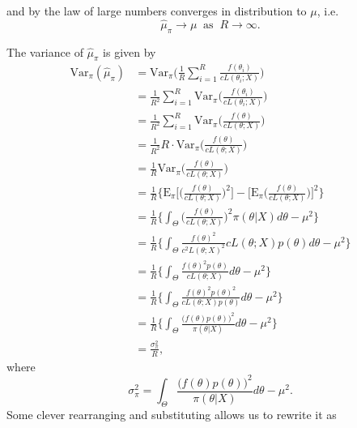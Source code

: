 \documentclass[
  12pt]{article}
\begin{document}
and by the law of large numbers converges in distribution to \(\mu\),
i.e. \[
\hat{\mu}_{\pi} \to \mu \> \text{ as } \> R \to \infty.
\]

The variance of \(\hat{\mu}_{\pi}\) is given by \[
\begin{aligned}
\text{Var}_{\pi}(\hat{\mu}_{\pi}) &= \text{Var}_{\pi}\Bigg(\frac{1}{R} \sum_{i=1}^R \frac{f(\theta_i)}{c L(\theta_i;X)}\Bigg) \\
                                  &= \frac{1}{R^2} \sum_{i=1}^R \text{Var}_{\pi}\Bigg(\frac{f(\theta_i)}{c L(\theta_i;X)}\Bigg) \\
                                  &= \frac{1}{R^2} \sum_{i=1}^R \text{Var}_{\pi}\Bigg(\frac{f(\theta)}{c L(\theta;X)}\Bigg) \\
                                  &= \frac{1}{R^2} R \cdot  \text{Var}_{\pi}\Bigg(\frac{f(\theta)}{c L(\theta;X)}\Bigg) \\
                                  &= \frac{1}{R} \text{Var}_{\pi}\Bigg(\frac{f(\theta)}{c L(\theta;X)}\Bigg) \\
                                  &= \frac{1}{R} \Bigg\{ \text{E}_{\pi}\Bigg[\bigg(\frac{f(\theta)}{c L(\theta;X)}\bigg)^2\Bigg] - \Bigg[\text{E}_{\pi}\bigg(\frac{f(\theta)}{c L(\theta;X)}\bigg)\Bigg]^2\Bigg\} \\
                                  &= \frac{1}{R} \Bigg\{ \int_{\Theta} \bigg(\frac{f(\theta)}{c L(\theta;X)}\bigg)^2 \pi(\theta | X) d\theta - \mu^2\Bigg\} \\
                                  &= \frac{1}{R} \Bigg\{ \int_{\Theta} \frac{f(\theta)^2}{c^2L(\theta;X)^2} cL(\theta;X)p(\theta) d\theta - \mu^2\Bigg\} \\
                                  &= \frac{1}{R} \Bigg\{ \int_{\Theta} \frac{f(\theta)^2 p(\theta)}{cL(\theta;X)} d\theta - \mu^2\Bigg\} \\
                                  &= \frac{1}{R} \Bigg\{ \int_{\Theta} \frac{f(\theta)^2 p(\theta)^2}{cL(\theta;X)p(\theta)} d\theta - \mu^2\Bigg\} \\
                                  &= \frac{1}{R} \Bigg\{ \int_{\Theta} \frac{\big(f(\theta) p(\theta)\big)^2}{\pi(\theta | X)} d\theta - \mu^2\Bigg\} \\
                                  &= \frac{\sigma_{\pi}^2}{R},
\end{aligned}
\] where \[
\sigma_{\pi}^2 = \int_{\Theta} \frac{\big(f(\theta) p(\theta)\big)^2}{\pi(\theta | X)} d\theta - \mu^2.
\] Some clever rearranging and substituting allows us to rewrite it as
\end{document}
